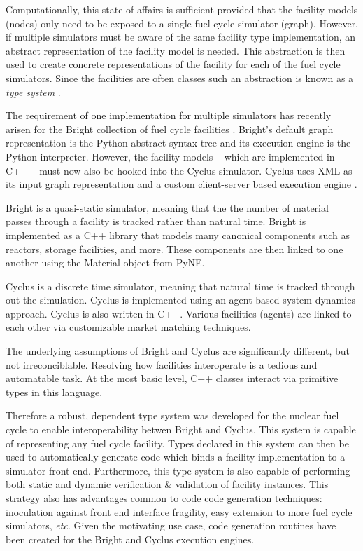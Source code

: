 \documentclass{ansconfpaper}
\begin{document}
Computationally, this state-of-affairs is sufficient provided that the facility 
models (nodes) only need to be exposed to a single fuel cycle simulator (graph).
However, if multiple simulators must be aware of the same facility type 
implementation, an  abstract representation of the facility model is needed.  
This abstraction is then
used to create concrete representations of the facility for each of the fuel cycle
simulators.  Since the facilities are often classes such an abstraction is 
known as a \emph{type system} \cite{Pierce:2002:TPL:509043}.

The requirement of one implementation for multiple simulators has recently
arisen for the Bright collection of fuel cycle facilities \cite{Scopatz2009}.
Bright's default graph representation is the Python abstract syntax tree and its
execution engine is the Python interpreter.  However, the facility models -- 
which are implemented in C++ -- must now also be hooked into the Cyclus simulator.  
Cyclus uses XML as its input graph representation and a custom client-server based 
execution engine \cite{cyclus2012}.

Bright is a quasi-static simulator, meaning that the the number of material
passes through a facility is tracked rather than natural time. Bright is implemented 
as a C++ library that models many canonical components such as reactors, storage 
facilities, and more. These components are then linked to one another using the 
Material object from PyNE.

Cyclus is a discrete time simulator, meaning that natural time is tracked through out
the simulation.  Cyclus is implemented using an agent-based system dynamics approach.
Cyclus is also written in C++.  Various facilities (agents) are linked to each other
via customizable market matching techniques.  

The underlying assumptions of Bright and Cyclus are significantly different, 
but not irreconciblable.  Resolving how facilities interoperate is a tedious
and automatable task.  At the most basic level, C++ classes interact via primitive
types in this language.

Therefore a robust, dependent type system was developed for the nuclear fuel cycle
to enable interoperability betwen Bright and Cyclus.
This system is capable of representing any fuel cycle facility.  Types declared in 
this system can then be used to automatically generate code which binds a facility 
implementation to a simulator front end.  
Furthermore, this type system is also capable of performing both static and dynamic
verification \& validation of facility instances.
This strategy also has advantages common to code code generation techniques:
inoculation against front end interface fragility, easy 
extension to more fuel cycle simulators, \emph{etc}.
Given the motivating use case, code 
generation routines have been created for the Bright and Cyclus execution engines.
\end{document}
